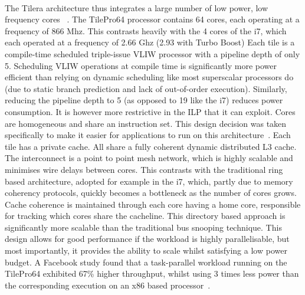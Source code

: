 \paragraph{} The Tilera architecture thus integrates a large number of low power, 
low frequency cores ~\cite{wentzlaff2007tile}. The TilePro64 processor contains 
64 cores, each operating at a frequency of 866 Mhz. This contrasts heavily
with the 4 cores of the i7, which each operated at a frequency of 2.66 Ghz (2.93 with
Turbo Boost)  Each tile is a compile-time scheduled triple-issue VLIW processor with 
a pipeline depth of only 5. Scheduling VLIW operations at compile time is 
significantly more power efficient
than relying on dynamic scheduling like most superscalar processors do (due to
static branch prediction and lack of out-of-order execution). Similarly,
reducing the pipeline depth to 5 (as opposed to 19 like the i7) reduces
power consumption. 
It is however more restrictive in the ILP that it can exploit. Cores are homogeneous and share 
an instruction set. This design decision was taken specifically to make it 
easier for applications to run on this architecture~\cite{wentzlaff2007tile}. Each
tile has a private cache. All share a fully coherent dynamic
distributed L3 cache.  The interconnect is a point to point mesh network, which
is highly scalable and minimises wire delays between cores. This
contrasts with the traditional ring based architecture, adopted for example
in the i7,  which, partly due to memory coherency protocols, quickly becomes a bottleneck
as the number of cores grows. Cache coherence is maintained
through each core having a home core, responsible for tracking
which cores share the cacheline. This directory based approach is significantly
more scalable than the traditional bus snooping technique.  This design allows for good performance
if the workload is highly parallelisable, but most
importantly, it provides the ability to scale whilst satisfying a low power budget. 
A Facebook study found that a task-parallel workload running on the TilePro64 exhibited
67\% higher throughput, whilst using 3 times less power than the corresponding
execution on an x86 based processor~\cite{berezecki2011manycore}. 

